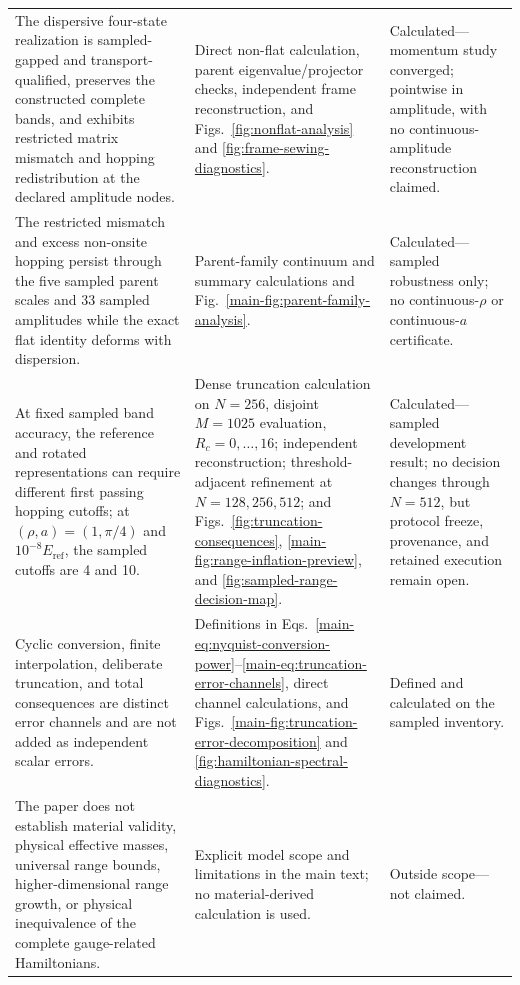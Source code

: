 \documentclass[11pt]{article}
\begin{document}
\begin{longtable}{@{}>{\raggedright\arraybackslash}p{}>{\raggedright\arraybackslash}p{}>{\raggedright\arraybackslash}p{}@{}}
The dispersive four-state realization is sampled-gapped and transport-qualified, preserves the constructed complete bands, and exhibits restricted matrix mismatch and hopping redistribution at the declared amplitude nodes. & Direct non-flat calculation, parent eigenvalue/projector checks, independent frame reconstruction, and Figs.~\ref{fig:nonflat-analysis} and \ref{fig:frame-sewing-diagnostics}. & Calculated---momentum study converged; pointwise in amplitude, with no continuous-amplitude reconstruction claimed.\\
The restricted mismatch and excess non-onsite hopping persist through the five sampled parent scales and 33 sampled amplitudes while the exact flat identity deforms with dispersion. & Parent-family continuum and summary calculations and Fig.~\ref{main-fig:parent-family-analysis}. & Calculated---sampled robustness only; no continuous-$\rho$ or continuous-$a$ certificate.\\
At fixed sampled band accuracy, the reference and rotated representations can require different first passing hopping cutoffs; at $(\rho,a)=(1,\pi/4)$ and $10^{-8}E_{\mathrm{ref}}$, the sampled cutoffs are 4 and 10. & Dense truncation calculation on $N=256$, disjoint $M=1025$ evaluation, $R_c=0,\ldots,16$; independent reconstruction; threshold-adjacent refinement at $N=128,256,512$; and Figs.~\ref{fig:truncation-consequences}, \ref{main-fig:range-inflation-preview}, and \ref{fig:sampled-range-decision-map}. & Calculated---sampled development result; no decision changes through $N=512$, but protocol freeze, provenance, and retained execution remain open.\\
Cyclic conversion, finite interpolation, deliberate truncation, and total consequences are distinct error channels and are not added as independent scalar errors. & Definitions in Eqs.~\eqref{main-eq:nyquist-conversion-power}--\eqref{main-eq:truncation-error-channels}, direct channel calculations, and Figs.~\ref{main-fig:truncation-error-decomposition} and \ref{fig:hamiltonian-spectral-diagnostics}. & Defined and calculated on the sampled inventory.\\
The paper does not establish material validity, physical effective masses, universal range bounds, higher-dimensional range growth, or physical inequivalence of the complete gauge-related Hamiltonians. & Explicit model scope and limitations in the main text; no material-derived calculation is used. & Outside scope---not claimed.\\
\bottomrule
\end{longtable}
\normalsize
\end{document}

